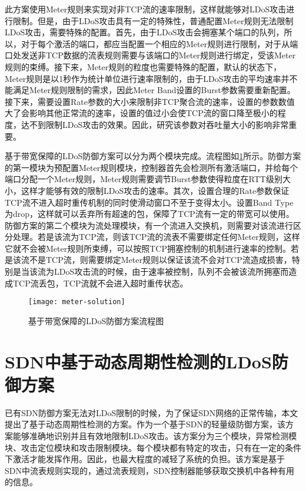 此方案使用Meter规则来实现对非TCP流的速率限制，这样就能够对LDoS攻击进行限制。但是，由于LDoS攻击具有一定的特殊性，普通配置Meter规则无法限制LDoS攻击，需要特殊的配置。首先，由于LDoS攻击会拥塞某个端口的队列，所以，对于每个激活的端口，都应当配置一个相应的Meter规则进行限制，对于从端口处发送非TCP数据的流表规则需要与该端口的Meter规则进行绑定，受该Meter规则的束缚。接下来，Meter规则的粒度也需要特殊的配置，默认的状态下，Meter规则是以1秒作为统计单位进行速率限制的，由于LDoS攻击的平均速率并不能满足Meter规则限制的需求，因此Meter Band设置的Burst参数需要重新配置。接下来，需要设置Rate参数的大小来限制非TCP聚合流的速率，设置的参数数值大了会影响其他正常流的速率，设置的值过小会使TCP流的窗口降至极小的程度，达不到限制LDoS攻击的效果。因此，研究该参数对吞吐量大小的影响非常重要。


基于带宽保障的LDoS防御方案可以分为两个模块完成。流程图如\ref{fig:meter-solution}所示。防御方案的第一模块为预配置Meter规则模块，控制器首先会检测所有激活端口，并给每个端口分配一个Meter规则，Meter规则需要调节Burst参数使得粒度在RTT级别大小，这样才能够有效的限制LDoS攻击的速率。其次，设置合理的Rate参数保证TCP流不进入超时重传机制的同时使滑动窗口不至于变得太小。设置Band Type为drop，这样就可以丢弃所有超速的包，保障了TCP流有一定的带宽可以使用。防御方案的第二个模块为流处理模块，有一个流进入交换机，则需要对该流进行区分处理。若是该流为TCP流，则该TCP流的流表不需要绑定任何Meter规则，这样它就不会被Meter规则所束缚，可以按照TCP拥塞控制的机制进行速率的控制。若是该流不是TCP流，则需要绑定Meter规则以保证该流不会对TCP流造成损害，特别是当该流为LDoS攻击流的时候，由于速率被控制，队列不会被该流所拥塞而造成TCP流丢包，TCP流就不会进入超时重传状态。



\begin{figure}
    \centering
    \texttt{[image: meter-solution]}
    \caption{基于带宽保障的LDoS防御方案流程图}
    \label{fig:meter-solution}
\end{figure}


\section{SDN中基于动态周期性检测的LDoS防御方案}
\label{chap4:SoftGuard}
已有SDN防御方案无法对LDoS限制的时候，为了保证SDN网络的正常传输，本文提出了基于动态周期性检测的方案。作为一个基于SDN的轻量级防御方案，该方案能够准确地识别并且有效地限制LDoS攻击。该方案分为三个模块，异常检测模块、攻击定位模块和攻击限制模块。每个模块都有特定的攻击，只有在一定的条件下激活才能发挥作用。因此，也最大程度的减轻了系统的负担。该方案是基于SDN中流表规则实现的，通过流表规则，SDN控制器能够获取交换机中各种有用的信息。

